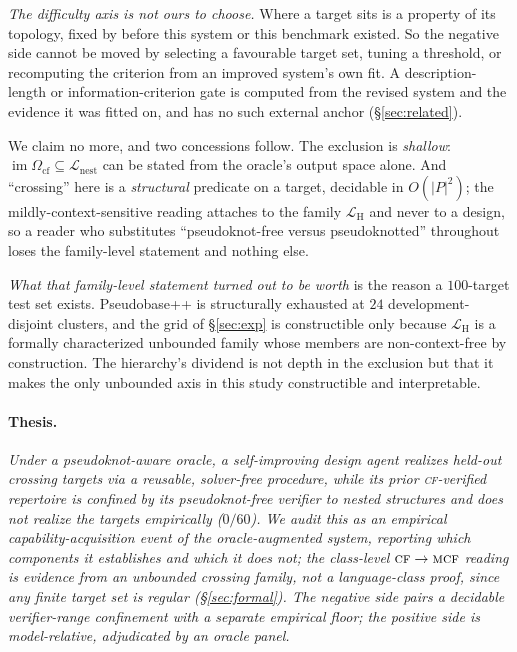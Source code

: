 \documentclass[11pt]{article}
\newcommand{\NESTED}{\ensuremath{\mathcal{L}_{\mathrm{nest}}}}
\newcommand{\CF}{\textsc{cf}}
\newcommand{\MCF}{\textsc{mcf}}
\newcommand{\Ocf}{\ensuremath{\Omega_{\mathrm{cf}}}}
\begin{document}
\emph{The difficulty axis is not ours to choose.} Where a target sits is a property of its topology,
fixed by \citet{rivaseddy2000,nebelweinberg,katosekikasami2006} before this system or this benchmark existed.
So the negative side cannot be moved by selecting a favourable target set, tuning a threshold, or recomputing
the criterion from an improved system's own fit. A description-length or
information-criterion gate is computed from the revised system and the evidence it was fitted on, and has no
such external anchor (\S\ref{sec:related}).

We claim no more, and two concessions follow. The exclusion is \emph{shallow}:
$\operatorname{im}\Ocf\subseteq\NESTED$ can be stated from the oracle's output space alone. And ``crossing''
here is a \emph{structural} predicate on a target, decidable in $O(|P|^2)$; the mildly-context-sensitive reading
attaches to the family $\mathcal L_{\mathrm H}$ and never to a design, so a reader who substitutes
``pseudoknot-free versus pseudoknotted'' throughout loses the family-level statement and nothing else.

\emph{What that family-level statement turned out to be worth} is the reason a $100$-target test set exists.
Pseudobase++ is structurally exhausted at $24$ development-disjoint clusters, and the grid of \S\ref{sec:exp}
is constructible only because $\mathcal L_{\mathrm H}$ is a formally characterized unbounded family whose
members are non-context-free by construction. The hierarchy's dividend is not depth in the exclusion but that
it makes the only unbounded axis in this study constructible and interpretable.

\paragraph{Thesis.} \emph{Under a pseudoknot-aware oracle, a self-improving design agent realizes held-out
crossing targets via a reusable, solver-free procedure, while its prior \CF-verified repertoire is confined by
its pseudoknot-free verifier to nested structures and does not realize the targets empirically ($0/60$). We
audit this as an empirical capability-acquisition event of the oracle-augmented system, reporting which
components it establishes and which it does not; the class-level $\CF\to\MCF$ reading is evidence from an
unbounded crossing family, not a language-class proof, since any finite target set is regular
(\S\ref{sec:formal}). The negative side pairs a decidable verifier-range confinement with a separate empirical
floor; the positive side is model-relative, adjudicated by an oracle panel.}
\end{document}
